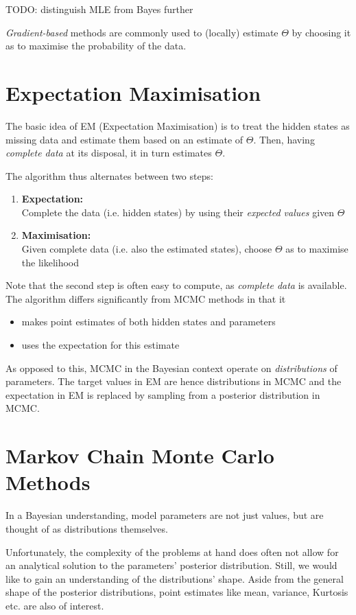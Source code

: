 TODO: distinguish MLE from Bayes further

\textit{Gradient-based} methods are commonly used to (locally) estimate $\Theta$ by choosing it as to maximise the probability of the data. 


\section{Expectation Maximisation}
 
The basic idea of EM (Expectation Maximisation) is to treat the hidden states as missing data and estimate them based on an estimate of $\Theta$. Then, having \textit{complete data} at its disposal, it in turn estimates $\Theta$. 

The algorithm thus alternates between two steps: 
\begin{enumerate}
	\item \textbf{Expectation:} \\
		  Complete the data (i.e. hidden states) by using their \textit{expected values} given $\Theta$
	\item \textbf{Maximisation:} \\
		  Given complete data (i.e. also the estimated states), choose $\Theta$ as to maximise the likelihood 
\end{enumerate} 

Note that the second step is often easy to compute, as \textit{complete data} is available. The algorithm differs significantly from MCMC methods in that it 
\begin{itemize}
	\item makes point estimates of both hidden states and parameters
	\item uses the expectation for this estimate
\end{itemize}

As opposed to this, MCMC in the Bayesian context operate on \textit{distributions} of parameters. The target values in EM are hence distributions in MCMC and the expectation in EM is replaced by sampling from a posterior distribution in MCMC. 


\section{Markov Chain Monte Carlo Methods}

	In a Bayesian understanding, model parameters are not just values, but are thought of as distributions themselves.
	
	Unfortunately, the complexity of the problems at hand does often not allow for an analytical solution to the parameters' posterior distribution. 
	Still, we would like to gain an understanding of the distributions' shape. Aside from the general shape of the posterior distributions, point estimates like mean, variance, Kurtosis etc. are also of interest. 
	
